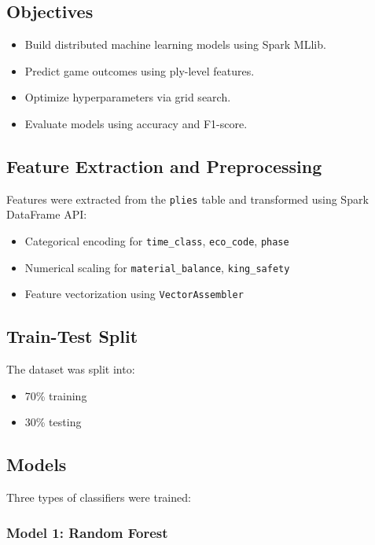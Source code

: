 \documentclass[12pt,a4paper]{article}
\begin{document}
\subsection{Objectives}

\begin{itemize}
    \item Build distributed machine learning models using Spark MLlib.
    \item Predict game outcomes using ply-level features.
    \item Optimize hyperparameters via grid search.
    \item Evaluate models using accuracy and F1-score.
\end{itemize}

\subsection{Feature Extraction and Preprocessing}

Features were extracted from the \texttt{plies} table and transformed using Spark DataFrame API:

\begin{itemize}
    \item Categorical encoding for \texttt{time\_class}, \texttt{eco\_code}, \texttt{phase}
    \item Numerical scaling for \texttt{material\_balance}, \texttt{king\_safety}
    \item Feature vectorization using \texttt{VectorAssembler}
\end{itemize}

\subsection{Train-Test Split}

The dataset was split into:

\begin{itemize}
    \item 70\% training
    \item 30\% testing
\end{itemize}

\subsection{Models}

Three types of classifiers were trained:

\subsubsection{Model 1: Random Forest}
\end{document}
